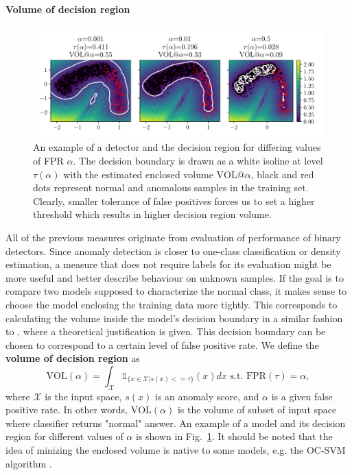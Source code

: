 \paragraph{Volume of decision region}
\begin{figure}
\centering
\includegraphics[scale=0.8]{data/chapter_intro/fig_vol_example.pdf}
\caption{An example of a detector and the decision region for differing values of FPR $\alpha$. The decision boundary is drawn as a white isoline at level $\tau(\alpha)$ with the estimated enclosed volume $\text{VOL@}\alpha$, black and red dots represent normal and anomalous samples in the training set. Clearly, smaller tolerance of false positives forces us to set a higher threshold which results in higher decision region volume.}
\label{fig:vol_example}
\end{figure}
All of the previous measures originate from evaluation of performance of binary detectors. Since anomaly detection is closer to one-class classification or density estimation, a measure that does not require labels for its evaluation might be more useful and better describe behaviour on unknown samples. If the goal is to compare two models supposed to characterize the normal class, it makes sense to choose the model enclosing the training data more tightly. This corresponds to calculating  the volume inside the model's decision boundary in a similar fashion to \cite{clemenccon2013scoring}, where a theoretical justification is given. This decision boundary can be chosen to correspond to a certain level of false positive rate. We define the \textbf{volume of decision region} as
\begin{equation}
  \text{VOL}(\alpha) = \int_{\mathcal{X}} \mathds{1}_{\lbrace x\in\mathcal{X}|s(x) <= \tau\rbrace} \left( x \right) dx  \text{ s.t. } \text{FPR}(\tau)=\alpha,
\end{equation}
where $\mathcal{X}$ is the input space, $s(x)$ is an anomaly score, and $\alpha$ is a given false positive rate. In other words, $\text{VOL}(\alpha)$ is the volume of subset of input space where classifier returns "normal" answer. An example of a model and its decision region for different values of $\alpha$ is shown in Fig.~\ref{fig:vol_example}. It should be noted that the idea of minizing the enclosed volume is native to some models, e.g. the OC-SVM algorithm \cite{scholkopf2001estimating}.

